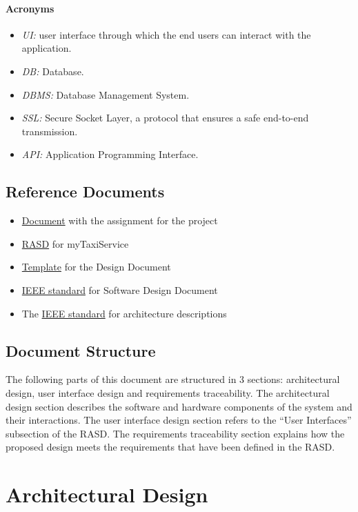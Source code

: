 \documentclass{article}
\begin{document}
\paragraph{Acronyms}
\begin{itemize}
	\item \textit{UI:} user interface through which the end users can interact with the application.
	\item \textit{DB:} Database.
	\item \textit{DBMS:} Database Management System.
	\item \textit{SSL:} Secure Socket Layer, a protocol that ensures a safe end-to-end transmission.
	\item \textit{API:} Application Programming Interface.
\end{itemize}
\subsection{Reference Documents}
\begin{itemize}
	\item \href{run:./external_references/assignments.pdf}{Document} with the assignment for the project
	\item \href{run:./external_references/Rasd.pdf}{RASD} for myTaxiService
	\item \href{run:./external_references/DDTOC.pdf}{Template} for the Design Document
	\item \href{run:./external_references/IEEESoftwareDesignDescriptions.pdf}{IEEE standard} for Software Design Document
	\item The \href{run:./external_references/IEEEArchitectureDescription.pdf}{IEEE standard} for architecture descriptions
\end{itemize}
\subsection{Document Structure}
The following parts of this document are structured in 3 sections: architectural design, user interface design and requirements traceability. The architectural design section describes the software and hardware components of the system and their interactions. The user interface design section refers to the ``User Interfaces'' subsection of the RASD\@. The requirements traceability section explains how the proposed design meets the requirements that have been defined in the RASD\@.
\clearpage
\section{Architectural Design}
\end{document}
